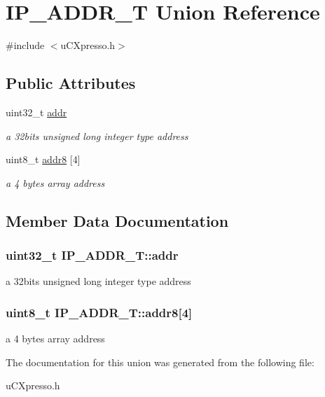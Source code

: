 \hypertarget{union_i_p___a_d_d_r___t}{\section{I\-P\-\_\-\-A\-D\-D\-R\-\_\-\-T Union Reference}
\label{union_i_p___a_d_d_r___t}
}


{\ttfamily \#include $<$u\-C\-Xpresso.\-h$>$}

\subsection*{Public Attributes}
\begin{DoxyCompactItemize}
\item 
uint32\-\_\-t \hyperlink{union_i_p___a_d_d_r___t_a7d804478df76fbcabec9ea3e252b07d4}{addr}
\begin{DoxyCompactList}\small\item\em a 32bits unsigned long integer type address \end{DoxyCompactList}\item 
uint8\-\_\-t \hyperlink{union_i_p___a_d_d_r___t_a46438b841f54b90fdaa0ef824dbcc2c2}{addr8} \mbox{[}4\mbox{]}
\begin{DoxyCompactList}\small\item\em a 4 bytes array address \end{DoxyCompactList}\end{DoxyCompactItemize}


\subsection{Member Data Documentation}
\hypertarget{union_i_p___a_d_d_r___t_a7d804478df76fbcabec9ea3e252b07d4}{
\subsubsection[{addr}]{\setlength{\rightskip}{0pt plus 5cm}uint32\-\_\-t I\-P\-\_\-\-A\-D\-D\-R\-\_\-\-T\-::addr}}\label{union_i_p___a_d_d_r___t_a7d804478df76fbcabec9ea3e252b07d4}


a 32bits unsigned long integer type address 

\hypertarget{union_i_p___a_d_d_r___t_a46438b841f54b90fdaa0ef824dbcc2c2}{
\subsubsection[{addr8}]{\setlength{\rightskip}{0pt plus 5cm}uint8\-\_\-t I\-P\-\_\-\-A\-D\-D\-R\-\_\-\-T\-::addr8\mbox{[}4\mbox{]}}}\label{union_i_p___a_d_d_r___t_a46438b841f54b90fdaa0ef824dbcc2c2}


a 4 bytes array address 



The documentation for this union was generated from the following file\-:\begin{DoxyCompactItemize}
\item 
u\-C\-Xpresso.\-h\end{DoxyCompactItemize}
